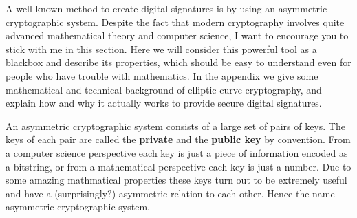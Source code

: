\documentclass[a4paper,12pt,oneside,openany]{book}
\begin{document}
A well known method to create digital signatures is by using an \gls{asymmetric cryptographic system}.
Despite the fact that modern cryptography involves quite advanced mathematical theory and computer science, I want to encourage you to stick with me in this section.
Here we will consider this powerful tool as a blackbox and describe its properties, which should be easy to understand even for people who have trouble with mathematics.
In the appendix we give some mathematical and technical background of elliptic curve cryptography, and explain how and why it actually works to provide secure digital signatures.

An asymmetric cryptographic system consists of a large set of pairs of keys.
The keys of each pair are called the \textbf{private} and the \textbf{public key} by convention.
From a computer science perspective each key is just a piece of information encoded as a bitstring, or from a mathematical perspective each key is just a number.
Due to some amazing mathmatical properties these keys turn out to be extremely useful and have a (surprisingly?) asymmetric relation to each other.
Hence the name asymmetric cryptographic system.
\end{document}
